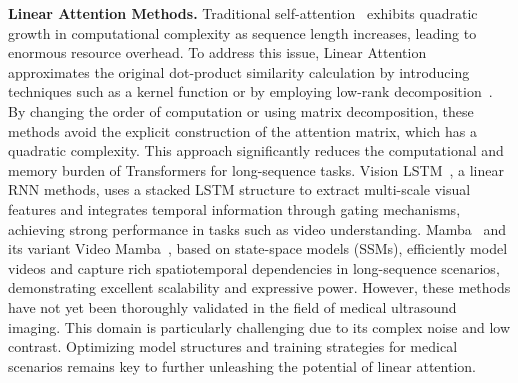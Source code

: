 
\noindent
\textbf{Linear Attention Methods.}
    \label{related:linear}
Traditional self-attention~\cite{vaswani2017attention} exhibits quadratic growth in computational complexity as sequence length increases, leading to enormous resource overhead. 
To address this issue, Linear Attention approximates the original dot-product similarity calculation by introducing techniques such as a kernel function \cite{katharopoulos_transformers_2020, choromanski2020rethinking} or by employing low-rank decomposition~\cite{wang2020linformer}. By changing the order of computation or using matrix decomposition, these methods avoid the explicit construction of the attention matrix, which has a quadratic complexity.
This approach significantly reduces the computational and memory burden of Transformers for long-sequence tasks. 
Vision LSTM~\cite{beck:24xlstm}, a linear RNN methods, uses a stacked LSTM structure to extract multi-scale visual features and integrates temporal information through gating mechanisms, achieving strong performance in tasks such as video understanding. Mamba~\cite{gu2023mamba} and its variant Video Mamba~\cite{li2024videomambastatespacemodel}, based on state-space models (SSMs), efficiently model videos and capture rich spatiotemporal dependencies in long-sequence scenarios, demonstrating excellent scalability and expressive power.
However, these methods have not yet been thoroughly validated in the field of medical ultrasound imaging. This domain is particularly challenging due to its complex noise and low contrast. 
Optimizing model structures and training strategies for medical scenarios remains key to further unleashing the potential of linear attention.